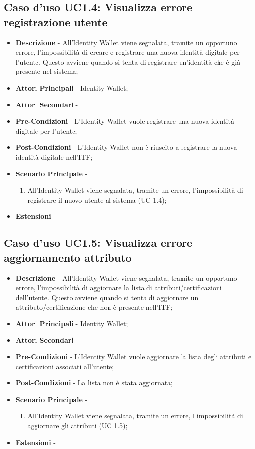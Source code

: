\subsection{Caso d'uso UC1.4: Visualizza errore registrazione utente}
\begin{itemize}
	\item \textbf{Descrizione} - All'Identity Wallet viene segnalata, tramite un opportuno errore, l'impossibilità di creare e registrare una nuova identità digitale per l'utente. Questo avviene quando si tenta di registrare un'identità che è già presente nel sistema;
	\item \textbf{Attori Principali} - Identity Wallet;
	\item \textbf{Attori Secondari} -
	\item \textbf{Pre-Condizioni} - L'Identity Wallet vuole registrare una nuova identità digitale per l'utente;
	\item \textbf{Post-Condizioni} - L'Identity Wallet non è riuscito a registrare la nuova identità digitale nell'\gls{ITF};
	\item \textbf{Scenario Principale} -
	\begin{enumerate}
		\item All'Identity Wallet viene segnalata, tramite un errore, l'impossibilità di registrare il nuovo utente al sistema (UC 1.4);
	\end{enumerate}
	\item \textbf{Estensioni} -
\end{itemize}
\subsection{Caso d'uso UC1.5: Visualizza errore aggiornamento attributo}
\begin{itemize}
	\item \textbf{Descrizione} - All'Identity Wallet viene segnalata, tramite un opportuno errore, l'impossibilità di aggiornare la lista di attributi/certificazioni dell'utente. Questo avviene quando si tenta di aggiornare un attributo/certificazione che non è presente nell'\gls{ITF};
	\item \textbf{Attori Principali} - Identity Wallet;
	\item \textbf{Attori Secondari} -
	\item \textbf{Pre-Condizioni} - L'Identity Wallet vuole aggiornare la lista degli attributi e certificazioni associati all'utente;
	\item \textbf{Post-Condizioni} - La lista non è stata aggiornata;
	\item \textbf{Scenario Principale} -
	\begin{enumerate}
		\item All'Identity Wallet viene segnalata, tramite un errore, l'impossibilità di aggiornare gli attributi (UC 1.5);
	\end{enumerate}
	\item \textbf{Estensioni} -
\end{itemize}
\newpage
